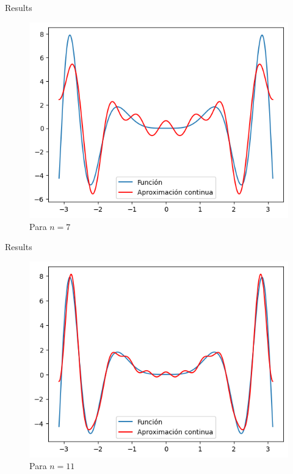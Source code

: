 \begin{frame}{Results}
    \begin{figure}
        \centering
        \includegraphics[width=.5\paperwidth]{p13-A-continua.png}
        \caption{Para $n=7$}
        \label{fig:enter-label}
    \end{figure}
\end{frame}
\begin{frame}{Results}
    \begin{figure}
        \centering
        \includegraphics[width=.5\paperwidth]{p13-A-cont3.png}
        \caption{Para $n=11$}
        \label{fig:enter-label}
    \end{figure}
\end{frame}